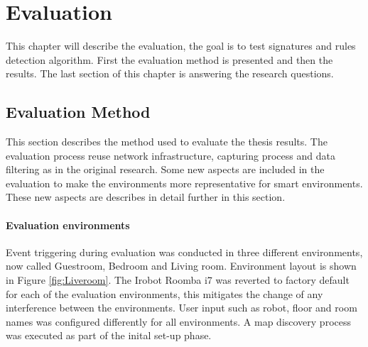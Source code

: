 \chapter{Evaluation}
\label{cap:Evaluation}
This chapter will describe the evaluation, the goal is to test signatures and rules detection algorithm. First the evaluation method is presented and then the results. The last section  of this chapter is answering the research questions. 

\section{Evaluation Method}
This section describes the method used to evaluate the thesis results. The evaluation process reuse network infrastructure, capturing process and data filtering as in the original research. Some new aspects are included in the evaluation to make the environments more representative for smart environments. These new aspects are describes in detail further in this section.

\subsubsection{Evaluation environments}
Event triggering during evaluation was conducted in three different environments, now called Guestroom, Bedroom and Living room. Environment layout is shown in Figure \ref{fig:Liveroom}. The Irobot Roomba i7 was reverted to factory default for each of the evaluation environments, this mitigates the change of any interference between the environments. User input such as robot, floor and room names was configured differently for all environments. A map discovery process was executed as part of the inital set-up phase.

